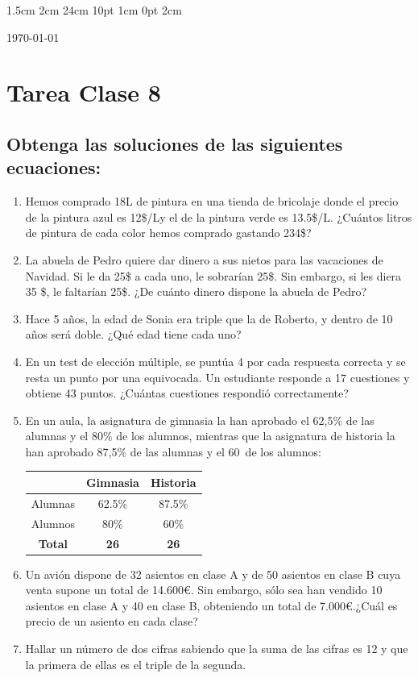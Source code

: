 \documentclass[12pt,letterpaper]{report}
\begin{document}
\setmargins{2.5cm}      
{1.5cm}                     
{2cm}  
{24cm}                    
{10pt}                          
{1cm}                          
{0pt}                             
{2cm}
\begin{flushright}
\today
\end{flushright}
\vspace{-1.75cm}
\section*{Tarea Clase 8}
\subsection*{Obtenga las soluciones de las siguientes ecuaciones:}
\begin{enumerate}
    \item Hemos comprado 18L de pintura en una tienda de bricolaje donde el precio de la pintura azul es 
    12\$/Ly el de la pintura verde es 13.5\$/L. ¿Cuántos litros de pintura de cada color hemos comprado gastando 
    234\$?
    \item La abuela de Pedro quiere dar dinero a sus nietos para las vacaciones de Navidad. Si le da 
    25\$ a cada uno, le sobrarían 25\$. Sin embargo, si les diera 35
    \$, le faltarían 25\$. ¿De cuánto dinero dispone la abuela de Pedro?
    \item Hace 5 años, la edad de Sonia era triple que la de Roberto, y dentro de 10 años será
    doble. ¿Qué edad tiene cada uno? 
    \item En un test de elección múltiple, se puntúa 4 por cada respuesta correcta y se resta un
    punto por una equivocada. Un estudiante responde a 17 cuestiones y obtiene 43
    puntos. ¿Cuántas cuestiones respondió correctamente?
    \item En un aula, la asignatura de gimnasia la han aprobado el 62,5\% de las alumnas y el 80\% de los alumnos, mientras que la asignatura de historia la han aprobado 87,5\% de las alumnas y el 60\ de los alumnos: 
    \begin{table}[H]
        \centering 
        \begin{tabular}{|c|c|c|}\hline
            & \textbf{Gimnasia} & \textbf{Historia} \\ \hline
            Alumnas & 62.5\% & 87.5\% \\ \hline
            Alumnos & 80\% & 60\% \\ \hline
            \textbf{Total} & \textbf{26} & \textbf{26}\\ \hline
        \end{tabular}
    \end{table}
    \item Un avión dispone de 32 asientos en clase A y de 50 asientos en clase B cuya venta supone un total de 14.600€. Sin embargo, sólo sea han vendido 10 asientos en clase A y 40 en clase B, obteniendo un total de 7.000€.¿Cuál es precio de un asiento en cada clase?
    \item Hallar un número de dos cifras sabiendo que la suma de las cifras es 12 y que la primera de ellas es el triple de la segunda.
\end{enumerate}
\end{document}
